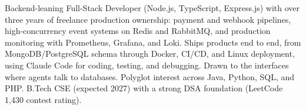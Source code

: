 \documentclass[11pt,a4paper,sans]{moderncv}
\begin{document}
\makecvtitle


\vspace{6pt}
\small{Backend-leaning Full-Stack Developer (Node.js, TypeScript, Express.js) with over three years of freelance production ownership: payment and webhook pipelines, high-concurrency event systems on Redis and RabbitMQ, and production monitoring with Prometheus, Grafana, and Loki. Ships products end to end, from MongoDB/PostgreSQL schema through Docker, CI/CD, and Linux deployment, using Claude Code for coding, testing, and debugging. Drawn to the interfaces where agents talk to databases. Polyglot interest across Java, Python, SQL, and PHP. B.Tech CSE (expected 2027) with a strong DSA foundation (LeetCode 1,430 contest rating).}

\end{document}
